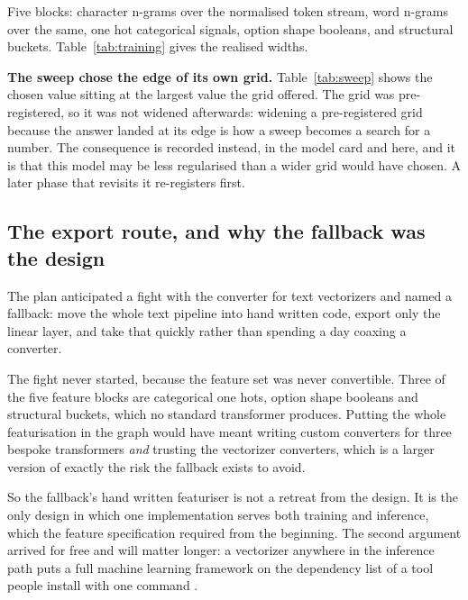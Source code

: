 Five blocks: character n-grams over the normalised token stream, word n-grams
over the same, one hot categorical signals, option shape booleans, and
structural buckets. Table~\ref{tab:training} gives the realised widths.

\begin{table}[htbp]
  \centering
  \caption{The training run that produced the shipped model.}
  \label{tab:training}
  
\end{table}

\begin{table}[htbp]
  \centering
  \caption{The pre-registered hyperparameter sweep, on development macro-F1.
  The grid was registered before the model existed and was not widened
  afterwards.}
  \label{tab:sweep}
  
\end{table}

\textbf{The sweep chose the edge of its own grid.} Table~\ref{tab:sweep} shows
the chosen value sitting at the largest value the grid offered. The grid was
pre-registered, so it was not widened afterwards: widening a pre-registered grid
because the answer landed at its edge is how a sweep becomes a search for a
number. The consequence is recorded instead, in the model card and here, and it
is that this model may be less regularised than a wider grid would have chosen.
A later phase that revisits it re-registers first.

\subsection{The export route, and why the fallback was the design}

The plan anticipated a fight with the converter for text vectorizers
\cite{skl2onnx} and named a fallback: move the whole text pipeline into hand
written code, export only the linear layer, and take that quickly rather than
spending a day coaxing a converter.

The fight never started, because the feature set was never convertible. Three of
the five feature blocks are categorical one hots, option shape booleans and
structural buckets, which no standard transformer produces. Putting the whole
featurisation in the graph would have meant writing custom converters for three
bespoke transformers \emph{and} trusting the vectorizer converters, which is a
larger version of exactly the risk the fallback exists to avoid.

So the fallback's hand written featuriser is not a retreat from the design. It
is the only design in which one implementation serves both training and
inference, which the feature specification required from the beginning. The
second argument arrived for free and will matter longer: a vectorizer anywhere in
the inference path puts a full machine learning framework on the dependency list
of a tool people install with one command \cite{scikit-learn,onnxruntime}.

